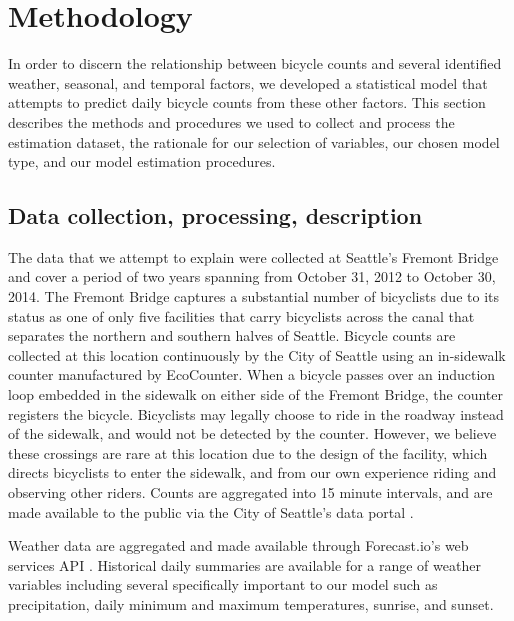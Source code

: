 \documentclass[12pt,letterpaper,article,twocolumn]{memoir}
\begin{document}
\section*{Methodology}
In order to discern the relationship between bicycle counts and
several identified weather, seasonal, and temporal factors, we
developed a statistical model that attempts to predict daily bicycle
counts from these other factors. This section describes the methods
and procedures we used to collect and process the estimation dataset,
the rationale for our selection of variables, our chosen model type,
and our model estimation procedures.

\subsection*{Data collection, processing, description}
%
% 

The data that we attempt to explain were collected at Seattle's
Fremont Bridge and cover a period of two years spanning from October
31, 2012 to October 30, 2014. The Fremont Bridge captures a
substantial number of bicyclists due to its status as one of only five
facilities that carry bicyclists across the canal that separates the
northern and southern halves of Seattle. Bicycle counts are collected
at this location continuously by the City of Seattle using an
in-sidewalk counter manufactured by EcoCounter. When a bicycle passes
over an induction loop embedded in the sidewalk on either side of the
Fremont Bridge, the counter registers the bicycle. Bicyclists may
legally choose to ride in the roadway instead of the sidewalk, and
would not be detected by the counter. However, we believe these
crossings are rare at this location due to the design of the facility,
which directs bicyclists to enter the sidewalk, and from our own
experience riding and observing other riders. Counts are aggregated
into 15 minute intervals, and are made available to the public via the
City of Seattle's data
portal \parencite{City-of-Seattle:aa,City-of-Seattle:ab}.

Weather data are aggregated and made available through Forecast.io's
web services API \parencite{The-Dark-Sky-Company:aa}. Historical daily
summaries are available for a range of weather variables including
several specifically important to our model such as precipitation,
daily minimum and maximum temperatures, sunrise, and sunset.
\end{document}
